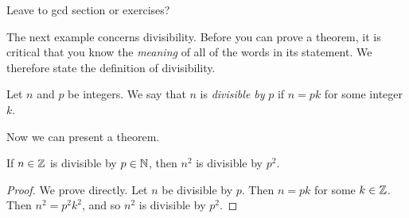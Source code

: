 \begin{exercises}{}{}
\begin{enumerate}
\end{enumerate}

\end{exercises}



% 



 Leave to gcd section or exercises?

The next example concerns divisibility. Before you can prove a theorem, it is critical that you know the \emph{meaning} of all of the words in its statement. We therefore state the definition of divisibility.

\begin{defn}{}{}
Let $n$ and $p$ be integers. We say that $n$ is \emph{divisible by} $p$ if $n=pk$ for some integer $k$.
\end{defn}

 Now we can present a theorem.

\begin{thm}{}{}
If $n\in\mathbb{Z}$ is divisible by $p\in\mathbb{N}$, then $n^2$ is divisible by $p^2$.
\end{thm}

\begin{proof}
We prove directly. Let $n$ be divisible by $p$. Then $n=pk$ for some $k\in\mathbb{Z}$. Then $n^2=p^2k^2$, and so $n^2$ is divisible by $p^2$.
\end{proof}

